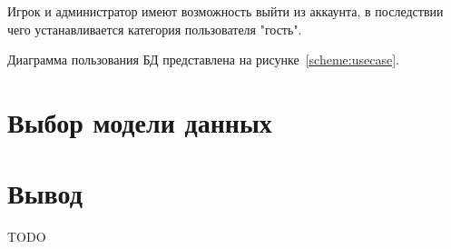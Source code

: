 Игрок и администратор имеют возможность выйти из аккаунта, в последствии чего устанавливается категория пользователя "гость".

Диаграмма пользования БД представлена на рисунке~\ref{scheme:usecase}.


\section{Выбор модели данных}

\section*{Вывод}

TODO
\clearpage
